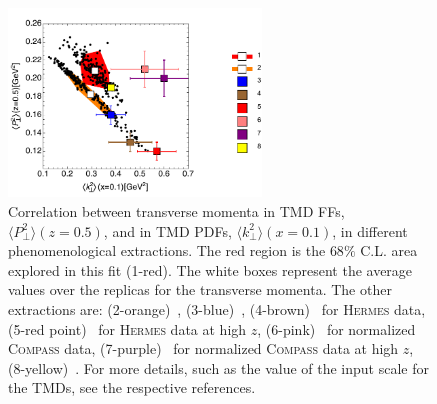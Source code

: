\documentclass[aps,preprintnumbers,showpacs,nofootinbib,superscriptaddress,floatfix]{revtex4}
\newcommand{\hermes}{\textsc{Hermes }}
\newcommand{\compass}{\textsc{Compass }}
\begin{document}
\begin{figure}[h!]
\begin{center}
\includegraphics[width=0.60\textwidth]{plots/kT2_PT2_flav_indep}
\end{center}
\caption{Correlation between transverse momenta in TMD FFs, $\langle P_\perp^2 \rangle(z=0.5)$, and in TMD PDFs, $\langle k_\perp^2 \rangle(x=0.1)$, in different phenomenological extractions. 
The red region is the $68\%$ C.L. area explored in this fit (1-red). The white boxes represent the average values over the replicas for the transverse momenta. 
The other extractions are: (2-orange)~\cite{Signori:2013mda}, (3-blue)~\cite{Schweitzer:2010tt}, (4-brown)~\cite{Anselmino:2013lza} for \hermes data, (5-red point)~\cite{Anselmino:2013lza} for \hermes data at high $z$, (6-pink)~\cite{Anselmino:2013lza} for normalized \compass data, (7-purple)~\cite{Anselmino:2013lza} for normalized \compass data at high $z$, (8-yellow)~\cite{Echevarria:2014xaa}.  
For more details, such as the value of the input scale for the TMDs, see the respective references.} 
\label{f:kT2_vs_PT2}
\end{figure}
\end{document}
